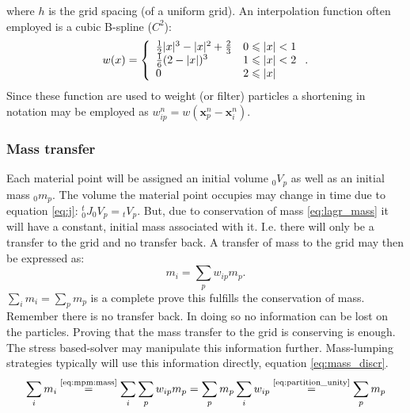 \documentclass[m,times]{cgMA}
\begin{document}
where $h$ is the grid spacing (of a uniform grid). An interpolation function often employed is a cubic B-spline ($C^2$):
\begin{equation}\label{eq:cubic_weights}
  w(x) = \left\{ \begin{array} { l l } { \frac { 1 } { 2 } | x | ^ { 3 } - | x | ^ { 2 } + \frac { 2 } { 3 } } & { 0 \leqslant | x | < 1 } \\ { \frac { 1 } { 6 } ( 2 - | x | ) ^ { 3 } } & { 1 \leqslant | x | < 2 } \\ { 0 } & { 2 \leqslant | x | } \end{array} \right. .
\end{equation}
Since these function are used to weight (or filter) particles a shortening in notation may be employed as $ w_{ip}^n = w(\boldsymbol{x}_p^n-\boldsymbol{x}_i^n)$.
\cite{MPM:APIC}\cite{MPM:COURSE}\cite{steffen2008analysis}\cite{gao2017adaptive}
\subsubsection{Mass transfer}\label{sec:mass}
Each material point will be assigned an initial volume $_0V_p$ as well as an initial mass $_0m_p$. The volume the material point occupies may change in time due to equation \ref{eq:j}: ${^t_0}J _0V_p = {_tV_p}$. But, due to conservation of mass \ref{eq:lagr_mass} it will have a constant, initial mass associated with it. I.e. there will only be a transfer to the grid and no transfer back.
A transfer of mass to the grid may then be expressed as:
\begin{equation}\label{eq:mpm:mass}
  m_i = \sum_p w_{ip}m_p.
\end{equation}
$\sum_i m_i =\sum_p m_p$ is a complete prove this fulfills the conservation of mass. Remember there is no transfer back. In doing so no information can be lost on the particles. Proving that the mass transfer to the grid is conserving is enough. The stress based-solver may manipulate this information further. Mass-lumping strategies typically will use this information directly, equation \ref{eq:mass_discr}.
\begin{equation}
  \sum_i m_i
  \stackrel{\text{\ref{eq:mpm:mass}}}{=}
  \sum _i \sum_p w_{ip} m_p =
  \sum _p m_p \sum_i w_{ip}
  \stackrel{\text{\ref{eq:partition_unity}}}{=}
  \sum_p m_p
\end{equation}
\begin{flushright}\cite{MPM:APIC}\cite{MPM:COURSE}\end{flushright}
\end{document}
